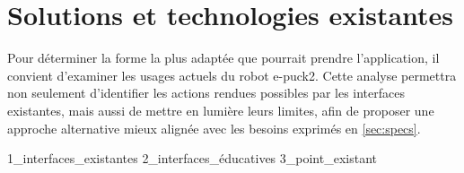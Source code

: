 \section{Solutions et technologies existantes}

Pour déterminer la forme la plus adaptée que pourrait prendre l’application, il convient d’examiner les usages actuels du robot e-puck2.  
Cette analyse permettra non seulement d’identifier les actions rendues possibles par les interfaces existantes, mais aussi de mettre en lumière leurs limites, afin de proposer une approche alternative mieux alignée avec les besoins exprimés en \autoref{sec:specs}.

{1_interfaces_existantes}
{2_interfaces_éducatives}
{3_point_existant}
